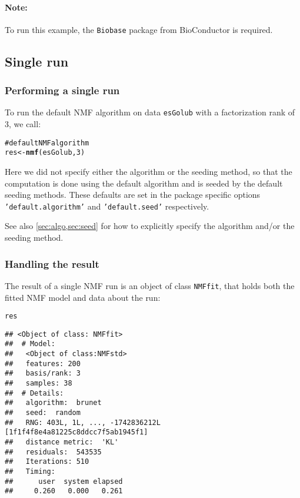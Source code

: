 \documentclass[a4paper]{article}\usepackage{graphicx, color}
\makeatletter
\newcommand{\hlfunctioncall}[1]{\textcolor[rgb]{0.501960784313725,0,0.329411764705882}{\textbf{#1}}}%
\newcommand{\hlcomment}[1]{\textcolor[rgb]{0.180392156862745,0.6,0.341176470588235}{#1}}%
\newenvironment{kframe}{%
 \def\at@end@of@kframe{}%
 \ifinner\ifhmode%
  \def\at@end@of@kframe{\end{minipage}}%
  \begin{minipage}{\columnwidth}%
 \fi\fi%
 \def\FrameCommand##1{\hskip\@totalleftmargin \hskip-\fboxsep
 \colorbox{shadecolor}{##1}\hskip-\fboxsep
     \hskip-\linewidth \hskip-\@totalleftmargin \hskip\columnwidth}%
 \MakeFramed {\advance\hsize-\width
   \@totalleftmargin\z@ \linewidth\hsize
   \@setminipage}}%
 {\par\unskip\endMakeFramed%
 \at@end@of@kframe}
\newenvironment{knitrout}{}{} %
\let\code=\texttt
\makeatother
\begin{document}

\paragraph{Note:} To run this example, the \code{Biobase} package from BioConductor is required.

\subsection{Single run}\label{sec:single_run}

\subsubsection{Performing a single run}
To run the default NMF algorithm on data \code{esGolub} with a factorization rank of 3, we call: 

\begin{knitrout}
\color{fgcolor}\begin{kframe}
\begin{alltt}
\hlcomment{# default NMF algorithm}
res <- \hlfunctioncall{nmf}(esGolub, 3)
\end{alltt}
\end{kframe}
\end{knitrout}


Here we did not specify either the algorithm or the seeding method, so that the computation is done using the default algorithm and is seeded by the 
default seeding methods.
These defaults are set in the package specific options \code{'default.algorithm'} 
and \code{'default.seed'} respectively.

See also \cref{sec:algo,sec:seed} for how to explicitly specify the algorithm and/or the seeding method.

\subsubsection{Handling the result}

The result of a single NMF run is an object of class \code{NMFfit}, that holds both the fitted NMF model and data about the run:

\begin{knitrout}
\color{fgcolor}\begin{kframe}
\begin{alltt}
res
\end{alltt}
\begin{verbatim}
## <Object of class: NMFfit>
##  # Model:
##   <Object of class:NMFstd>
##   features: 200 
##   basis/rank: 3 
##   samples: 38 
##  # Details:
##   algorithm:  brunet 
##   seed:  random 
##   RNG: 403L, 1L, ..., -1742836212L [1f1f4f8e4a81225c8ddcc7f5ab1945f1]
##   distance metric:  'KL' 
##   residuals:  543535 
##   Iterations: 510 
##   Timing:
##      user  system elapsed 
##     0.260   0.000   0.261
\end{verbatim}
\end{kframe}
\end{knitrout}
\end{document}
